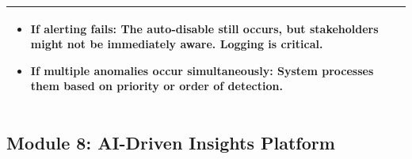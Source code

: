 \begin{minipage}{\textwidth}
\begin{tabularx}{\textwidth}{|p{}|X|}
{\begin{itemize}
            \item If alerting fails: The auto-disable still occurs, but stakeholders might not be immediately aware. Logging is critical.
            \item If multiple anomalies occur simultaneously: System processes them based on priority or order of detection.
        \end{itemize}%
        } \\
    \hline
\end{tabularx}
\end{minipage}
\bigskip

\subsection*{Module 8: AI-Driven Insights Platform}
\label{module:minipage:ai_driven_insights}

